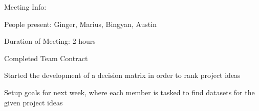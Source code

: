 Meeting Info\+:

People present\+: Ginger, Marius, Bingyan, Austin

Duration of Meeting\+: 2 hours


\begin{DoxyEnumerate}
\item Completed Team Contract
\end{DoxyEnumerate}
\begin{DoxyEnumerate}
\item Started the development of a decision matrix in order to rank project ideas
\end{DoxyEnumerate}
\begin{DoxyEnumerate}
\item Setup goals for next week, where each member is tasked to find datasets for the given project ideas 
\end{DoxyEnumerate}